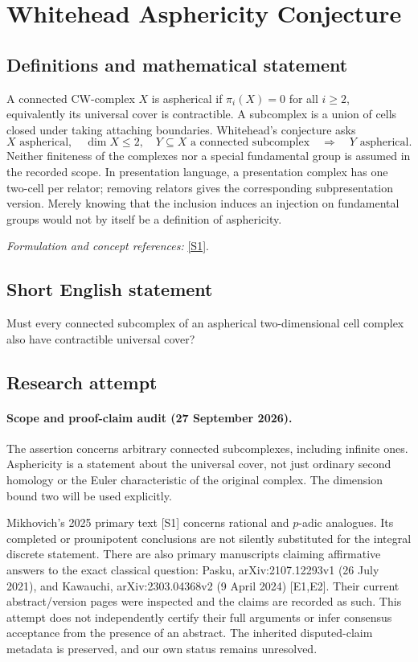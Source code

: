 \documentclass[11pt]{article}
\begin{document}
\section*{\texorpdfstring{Whitehead Asphericity Conjecture}{Whitehead Asphericity Conjecture}}\label{397}
\subsection{Definitions and mathematical statement}
A connected CW-complex $X$ is aspherical if $\pi_i(X)=0$ for all $i\ge2$, equivalently its universal cover is contractible. A subcomplex is a union of cells closed under taking attaching boundaries. Whitehead's conjecture asks
\[
 X\text{ aspherical},\quad\dim X\le2,\quad
 Y\subseteq X\text{ a connected subcomplex}
 \quad\Longrightarrow\quad Y\text{ aspherical}.
\]
Neither finiteness of the complexes nor a special fundamental group is assumed in the recorded scope. In presentation language, a presentation complex has one two-cell per relator; removing relators gives the corresponding subpresentation version. Merely knowing that the inclusion induces an injection on fundamental groups would not by itself be a definition of asphericity.
\par\smallskip\textit{Formulation and concept references:} \href{https://www.mathnet.ru/php/archive.phtml?jrnid=im&option_lang=rus&paperid=9597&wshow=paper}{[S1]}.

\subsection{Short English statement}
Must every connected subcomplex of an aspherical two-dimensional cell complex also have contractible universal cover?
\subsection{Research attempt}
\paragraph{Scope and proof-claim audit (27 September 2026).}
The assertion concerns arbitrary connected subcomplexes, including
infinite ones. Asphericity is a statement about the universal cover,
not just ordinary second homology or the Euler characteristic of the
original complex. The dimension bound two will be used explicitly.

Mikhovich's 2025 primary text [S1] concerns rational and $p$-adic analogues.
Its completed or prounipotent conclusions are not silently substituted
for the integral discrete statement. There are also primary manuscripts
claiming affirmative answers to the exact classical question: Pasku,
arXiv:2107.12293v1 (26 July 2021), and Kawauchi,
arXiv:2303.04368v2 (9 April 2024) [E1,E2]. Their current abstract/version
pages were inspected and the claims are recorded as such. This attempt
does not independently certify their full arguments or infer consensus
acceptance from the presence of an abstract. The inherited disputed-claim
metadata is preserved, and our own status remains unresolved.
\end{document}
